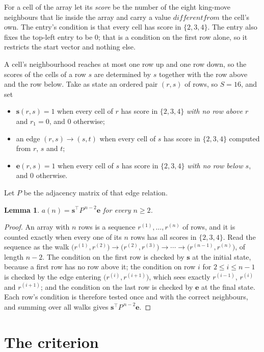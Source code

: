 \documentclass[11pt,a4paper]{article}
\theoremstyle{plain}
\newtheorem{lemma}[theorem]{Lemma}
\theoremstyle{definition}
\begin{document}
For a cell of the array let its \emph{score} be the number of the eight king-move neighbours that lie inside
the array and carry a value $different from$ the cell's own. The entry's condition is that every cell
has score in $\{2,3,4\}$. The entry also fixes the top-left entry to be $0$; that is a condition on the first row alone, so it restricts the start vector and nothing else.

A cell's neighbourhood reaches at most one row up and one row down, so the scores of the
cells of a row $s$ are determined by $s$ together with the row above and the row below.
Take as state an ordered pair $(r,s)$ of rows, so $S=16$, and set
\begin{itemize}
\item $\mathbf{s}(r,s)=1$ when every cell of $r$ has score in $\{2,3,4\}$ \emph{with no row
above $r$} and $r_1=0$, and $0$ otherwise;
\item an edge $(r,s)\to(s,t)$ when every cell of $s$ has score in $\{2,3,4\}$ computed from
$r$, $s$ and $t$;
\item $\mathbf{e}(r,s)=1$ when every cell of $s$ has score in $\{2,3,4\}$ \emph{with no row
below $s$}, and $0$ otherwise.
\end{itemize}
Let $P$ be the adjacency matrix of that edge relation.

\begin{lemma}\label{lem:walk}
$a(n)=\mathbf{s}^{\!\top}P^{\,n-2}\mathbf{e}$ for every $n\ge2$.
\end{lemma}

\begin{proof}
An array with $n$ rows is a sequence $r^{(1)},\dots,r^{(n)}$ of rows, and it is counted
exactly when every one of its $n$ rows has all scores in $\{2,3,4\}$. Read the sequence as the
walk $\bigl(r^{(1)},r^{(2)}\bigr)\to\bigl(r^{(2)},r^{(3)}\bigr)\to\cdots\to
\bigl(r^{(n-1)},r^{(n)}\bigr)$, of length $n-2$. The condition on the first row is
checked by $\mathbf{s}$ at the initial state, because a first row has no row above it; the
condition on row $i$ for $2\le i\le n-1$ is checked by the edge entering
$\bigl(r^{(i)},r^{(i+1)}\bigr)$, which sees exactly $r^{(i-1)}$, $r^{(i)}$ and
$r^{(i+1)}$; and the condition on the last row is checked by $\mathbf{e}$ at the final
state. Each row's condition is therefore tested once and with the correct neighbours, and
summing over all walks gives $\mathbf{s}^{\!\top}P^{\,n-2}\mathbf{e}$.
\end{proof}

\section{The criterion}
\end{document}
